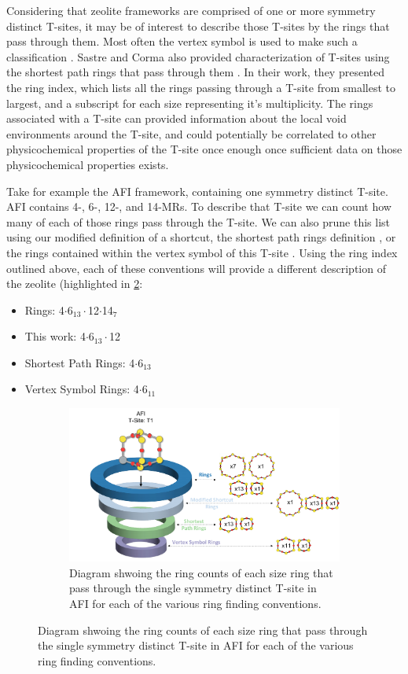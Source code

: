 \documentclass[preprint,numrefs,noinfo,sort&compress]{elsarticle}
\begin{document}
Considering that zeolite frameworks are comprised of one or more symmetry distinct T-sites, it may be of interest to describe those T-sites by the rings that pass through them. Most often the vertex symbol is used to make such a classification \cite{okeeffe-vertex-1997}. Sastre and Corma also provided characterization of T-sites using the shortest path rings that pass through them \cite{sastre-topological-2009}. In their work, they presented the ring index, which lists all the rings passing through a T-site from smallest to largest, and a subscript for each size representing it's multiplicity.  The rings associated with a T-site can provided information about the local void environments around the T-site, and could potentially be correlated to other physicochemical properties of the T-site once enough once sufficient data on those physicochemical properties exists. 

Take for example the AFI framework, containing one symmetry distinct T-site. AFI contains 4-, 6-, 12-, and 14-MRs. To describe that T-site we can count how many of each of those rings pass through the T-site. We can also prune this list using our modified definition of a shortcut, the shortest path rings definition \cite{sastre-topological-2009}, or the rings contained within the vertex symbol of this T-site \cite{okeeffe-vertex-1997}. Using the ring index outlined above, each of these conventions will provide a different description of the zeolite (highlighted in \cref{fig:afi-funnel}:
\begin{itemize}
\item Rings: 4\(\cdot\)6\(_{\text{13}} \cdot\)12\(\cdot\)14\(_{\text{7}}\)
\item This work: 4\(\cdot\)6\(_{\text{13}} \cdot\)12
\item Shortest Path Rings: 4\(\cdot\)6\(_{\text{13}}\)
\item Vertex Symbol Rings: 4\(\cdot\)6\(_{\text{11}}\)
\end{itemize}

\begin{figure}
\begin{figure}[H]
\centering
\includegraphics[width=\textwidth]{figures/chapter-3/afi-funnel.pdf}
\caption{Diagram shwoing the ring counts of each size ring that pass through the single symmetry distinct T-site in AFI for each of the various ring finding conventions. \label{fig:afi-funnel}}
\end{figure}
\end{figure}
\end{document}
